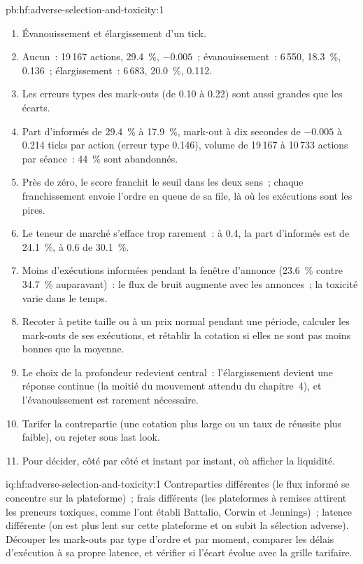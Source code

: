 \begin{solution}{pb:hf:adverse-selection-and-toxicity:1}
\begin{enumerate}
contrepartie connue.
\item Évanouissement et élargissement d'un tick.
\item Aucun~: 19\,167 actions, 29.4~\%, $-0.005$~; évanouissement~: 6\,550, 18.3~\%, 0.136~; élargissement~: 6\,683, 20.0~\%, 0.112.
\item Les erreurs types des mark-outs (de 0.10 à 0.22) sont aussi grandes que les écarts.
\item Part d'informés de 29.4~\% à 17.9~\%, mark-out à dix secondes de $-0.005$ à 0.214 ticks par action (erreur type 0.146), volume de 19\,167 à
10\,733 actions par séance~: 44~\% sont abandonnés.
\item Près de zéro, le score franchit le seuil dans les deux sens~; chaque franchissement envoie l'ordre en queue de sa file, là où les exécutions sont les pires.
\item Le teneur de marché s'efface trop rarement~: à 0.4, la part d'informés est de 24.1~\%, à 0.6 de 30.1~\%.
\item Moins d'exécutions informées pendant la fenêtre d'annonce (23.6~\% contre 34.7~\% auparavant)~: le flux de bruit augmente avec les annonces~; la toxicité varie dans le temps.
\item Recoter à petite taille ou à un prix normal pendant une période, calculer les mark-outs de ses exécutions, et rétablir la cotation si elles ne sont pas moins bonnes que la moyenne.
\item Le choix de la profondeur redevient central~: l'élargissement devient une réponse continue (la moitié du mouvement attendu du chapitre~4), et l'évanouissement est rarement nécessaire.
\item Tarifer la contrepartie (une cotation plus large ou un taux de réussite plus faible), ou rejeter sous last look.
\item Pour décider, côté par côté et instant par instant, où afficher la liquidité.
\end{enumerate}
\end{solution}

\begin{solution}{iq:hf:adverse-selection-and-toxicity:1}
Contreparties différentes (le flux informé se concentre sur la plateforme)~; frais différents (les plateformes à remises attirent les preneurs toxiques, comme l'ont établi Battalio, Corwin et
Jennings)~; latence différente (on est plus lent sur cette plateforme et on subit la sélection adverse). Découper les mark-outs par type d'ordre et par moment, comparer les délais d'exécution à sa propre
latence, et vérifier si l'écart évolue avec la grille tarifaire.
\end{solution}

